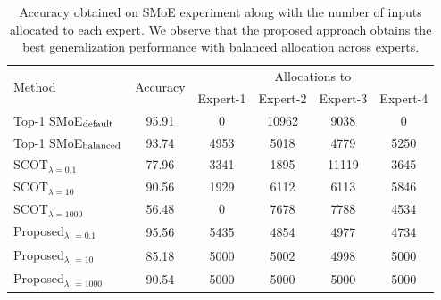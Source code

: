 \begin{table}[t]
\caption[Evaluation of proposed Sparse-OT framework for learning a sparse-mixture-of-experts model.]{Accuracy obtained on SMoE experiment along with the number of inputs allocated to each expert. We observe that the proposed approach obtains the best generalization performance with balanced allocation across experts.}
\label{table-cifar}
\centering
\setlength{\tabcolsep}{1.1pt}
\begin{tabular}{lcc|c|c|c}
\toprule
\multirow{2}{*}{Method} & \multirow{2}{*}{Accuracy} & \multicolumn{4}{c}{Allocations to}\\
& & \small{Expert-1} & \small{Expert-2} & \small{Expert-3} & \small{Expert-4}\normalsize\\
\midrule
    Top-1 SMoE$_{\textup{default}}$ \citep{chen2022towards} & 95.91 & 0 & 10962 & 9038 & 0\\
    Top-1 SMoE$_{\textup{balanced}}$ \citep{chen2022towards} & 93.74 & 4953 & 5018 & 4779 & 5250\\
    \midrule
    SCOT$_{\lambda=0.1}$ \citep{liu2023sparsityconstrained} & 77.96 & 3341 & 1895 & 11119 & 3645\\
    SCOT$_{\lambda=10}$ \citep{liu2023sparsityconstrained} & 90.56 & 1929 & 6112 & 6113 & 5846\\
    SCOT$_{\lambda=1000}$ \citep{liu2023sparsityconstrained} & 56.48 & 0 & 7678 & 7788 & 4534\\
    \midrule
    \rowcolor{green!10}
    Proposed$_{\lambda_1=0.1}$ & 95.56 & 5435 & 4854 & 4977 & 4734\\
    Proposed$_{\lambda_1=10}$ & 85.18 & 5000 & 5002 & 4998 & 5000\\
    Proposed$_{\lambda_1=1000}$ & 90.54 & 5000 & 5000 & 5000 & 5000\\
\bottomrule
\end{tabular}
\end{table}

